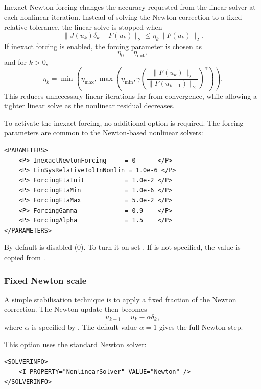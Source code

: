 Inexact Newton forcing changes the accuracy requested from the linear solver at
each nonlinear iteration. Instead of solving the Newton correction to a fixed
relative tolerance, the linear solve is stopped when
$$
    \|J(u_k)\delta_k - F(u_k)\|_2
    \leq \eta_k \|F(u_k)\|_2.
$$
If inexact forcing is enabled, the forcing parameter is chosen as
$$
    \eta_0 = \eta_{\mathrm{init}},
$$
and for $k>0$,
$$
    \eta_k =
    \min\left(
        \eta_{\max},
        \max\left(
            \eta_{\min},
            \gamma
            \left(
                \frac{\|F(u_k)\|_2}{\|F(u_{k-1})\|_2}
            \right)^\alpha
        \right)
    \right).
$$
This reduces unnecessary linear iterations far from convergence, while allowing
a tighter linear solve as the nonlinear residual decreases.

To activate the inexact forcing, no additional  option is required. The forcing parameters are
common to the Newton-based nonlinear solvers:
\begin{lstlisting}[style=XMLStyle]
<PARAMETERS>
    <P> InexactNewtonForcing     = 0      </P>
    <P> LinSysRelativeTolInNonlin = 1.0e-6 </P>
    <P> ForcingEtaInit           = 1.0e-2 </P>
    <P> ForcingEtaMin            = 1.0e-6 </P>
    <P> ForcingEtaMax            = 5.0e-2 </P>
    <P> ForcingGamma             = 0.9    </P>
    <P> ForcingAlpha             = 1.5    </P>
</PARAMETERS>
\end{lstlisting}

By default  is disabled ($0$). To turn it on set . If
 is not specified, the value is copied from
.

\subsubsection{Fixed Newton scale}

A simple stabilisation technique is to apply a fixed fraction of the Newton correction.
The Newton update then becomes
$$
    u_{k+1} = u_k - \alpha \delta_k,
$$
where $\alpha$ is specified by . The default value
$\alpha=1$ gives the full Newton step.

This option uses the standard Newton solver:
\begin{lstlisting}[style=XMLStyle]
<SOLVERINFO>
    <I PROPERTY="NonlinearSolver" VALUE="Newton" />
</SOLVERINFO>
\end{lstlisting}

